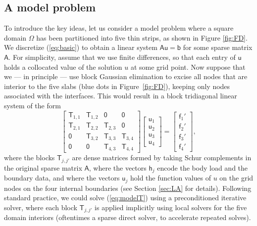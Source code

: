 \documentclass[final,onefignum,onetabnum]{siamart250211}
\newcommand{\vct}[1]{\bm{\mathsf{#1}}}
\newcommand{\mtx}[1]{\bm{\mathsf{#1}}}
\theoremstyle{definition}
\begin{document}
\subsection{A model problem}
\label{sec:toyproblem}
To introduce the key ideas, let us consider a model
problem where a square domain $\Omega$ has been partitioned into five
thin strips, as shown in Figure \ref{fig:FD}. We discretize (\ref{eq:basic})
to obtain a linear system $\mtx{A}\vct{u} = \vct{b}$ for some sparse
matrix $\mtx{A}$. For simplicity, assume that we use finite differences,
so that each entry of $\vct{u}$ holds a collocated
value of the solution $u$ at some grid point.
Now suppose that we --- in principle ---
use block Gaussian elimination to excise all nodes that are interior to
the five slabs (blue dots in Figure~\ref{fig:FD}), keeping only nodes associated with the interfaces.
This would result in a block tridiagonal linear system of the form
\begin{equation}
\label{eq:modelT}
\left[\begin{array}{rrrr}
\mtx{T}_{1,1} & \mtx{T}_{1,2} & \mtx{0}       & \mtx{0}       \\
\mtx{T}_{2,1} & \mtx{T}_{2,2} & \mtx{T}_{2,3} & \mtx{0}       \\
\mtx{0}       & \mtx{T}_{3,2} & \mtx{T}_{3,3} & \mtx{T}_{3,4} \\
\mtx{0}       & \mtx{0}       & \mtx{T}_{4,3} & \mtx{T}_{4,4}
\end{array}\right]
\left[\begin{array}{rrrr}
\vct{u}_{1} \\ \vct{u}_{2} \\ \vct{u}_{3} \\ \vct{u}_{4}
\end{array}\right]
=
\left[\begin{array}{rrrr}
\vct{f}_{1}' \\ \vct{f}_{2}' \\ \vct{f}_{3}' \\ \vct{f}_{4}'
\end{array}\right],
\end{equation}
where the blocks $\mtx{T}_{j,j'}$ are dense matrices formed by taking
Schur complements in the original sparse matrix $\mtx{A}$, where
the vectors $\vct{h}_{j}$ encode the body load and the boundary data,
and where the vectors $\vct{u}_{j}$ hold the function values of $u$ on
the grid nodes on the four internal boundaries (see Section \ref{sec:LA} for details).
Following standard practice, we could solve (\ref{eq:modelT}) using a
preconditioned iterative solver, where each block $\mtx{T}_{j,j'}$ is
applied implicitly using local solvers for the five domain interiors
(oftentimes a sparse direct solver, to accelerate repeated solves).
\end{document}
